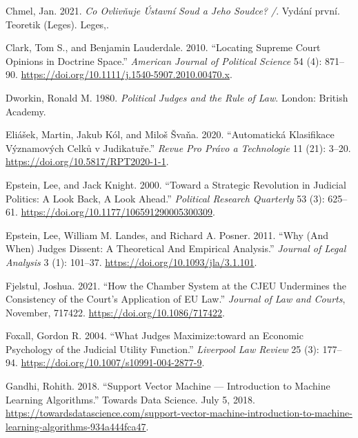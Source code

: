 \documentclass[
  11pt,
]{article}
\newlength{\cslhangindent}
\newenvironment{CSLReferences}[2] %
 {%
  \setlength{\parindent}{0pt}
  \ifodd #1 \everypar{\setlength{\hangindent}{\cslhangindent}}\ignorespaces\fi
  \ifnum #2 > 0
  \setlength{\parskip}{#2\baselineskip}
  \fi
 }%
 {}
\begin{document}
\begin{CSLReferences}{1}{0}
\leavevmode{}%
Chmel, Jan. 2021. \emph{Co Ovlivňuje {Ústavní} Soud a Jeho Soudce? /}.
Vydání první. Teoretik ({Leges}). {Leges,}.

\leavevmode{}%
Clark, Tom S., and Benjamin Lauderdale. 2010. {``Locating {Supreme Court
Opinions} in {Doctrine Space}.''} \emph{American Journal of Political
Science} 54 (4): 871--90.
\url{https://doi.org/10.1111/j.1540-5907.2010.00470.x}.

\leavevmode{}%
Dworkin, Ronald M. 1980. \emph{Political Judges and the Rule of Law}.
{London}: {British Academy}.

\leavevmode{}%
Eliášek, Martin, Jakub Kól, and Miloš Švaňa. 2020. {``Automatická
Klasifikace Významových Celků v Judikatuře.''} \emph{Revue Pro Právo a
Technologie} 11 (21): 3--20. \url{https://doi.org/10.5817/RPT2020-1-1}.

\leavevmode{}%
Epstein, Lee, and Jack Knight. 2000. {``Toward a {Strategic Revolution}
in {Judicial Politics}: {A Look Back}, {A Look Ahead}.''}
\emph{Political Research Quarterly} 53 (3): 625--61.
\url{https://doi.org/10.1177/106591290005300309}.

\leavevmode{}%
Epstein, Lee, William M. Landes, and Richard A. Posner. 2011. {``Why
({And When}) {Judges Dissent}: {A Theoretical And Empirical
Analysis}.''} \emph{Journal of Legal Analysis} 3 (1): 101--37.
\url{https://doi.org/10.1093/jla/3.1.101}.

\leavevmode{}%
Fjelstul, Joshua. 2021. {``How the {Chamber System} at the {CJEU
Undermines} the {Consistency} of the {Court}'s {Application} of {EU
Law}.''} \emph{Journal of Law and Courts}, November, 717422.
\url{https://doi.org/10.1086/717422}.

\leavevmode{}%
Foxall, Gordon R. 2004. {``What Judges Maximize:toward an Economic
Psychology of the Judicial Utility Function.''} \emph{Liverpool Law
Review} 25 (3): 177--94.
\url{https://doi.org/10.1007/s10991-004-2877-9}.

\leavevmode{}%
Gandhi, Rohith. 2018. {``Support {Vector Machine} --- {Introduction} to
{Machine Learning Algorithms}.''} {Towards Data Science}. July 5, 2018.
\url{https://towardsdatascience.com/support-vector-machine-introduction-to-machine-learning-algorithms-934a444fca47}.


\end{CSLReferences}
\end{document}
